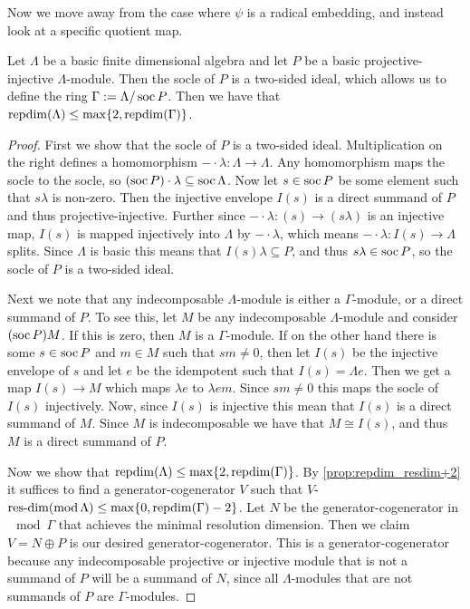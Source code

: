 Now we move away from the case where $\psi$ is a radical embedding, and instead look at a specific quotient map.

\begin{theorem}\cite[Proposition~1.2]{EHIS04}\label{thm:mod_out_socle}
	Let $\Lambda$ be a basic finite dimensional algebra and let $P$ be a basic projective-injective $\Lambda$-module. Then the socle of $P$ is a two-sided ideal, which allows us to define the ring $\Gamma := \Lambda / \operatorname{soc} P$. Then we have that $\operatorname{repdim}(\Lambda) \leq \max\{2, \operatorname{repdim}(\Gamma)\}$. 
	\begin{proof}
		First we show that the socle of $P$ is a two-sided ideal. Multiplication on the right defines a homomorphism $-\cdot \lambda\colon \Lambda \to \Lambda$. Any homomorphism maps the socle to the socle, so $(\operatorname{soc} P) \cdot \lambda \subseteq \operatorname{soc} \Lambda$. Now let $s \in \operatorname{soc} P$ be some element such that $s\lambda$ is non-zero. Then the injective envelope $I(s)$ is a direct summand of $P$ and thus projective-injective. Further since $-\cdot \lambda\colon (s) \to (s\lambda)$ is an injective map, $I(s)$ is mapped injectively into $\Lambda$ by $-\cdot \lambda$, which means $-\cdot\lambda\colon I(s) \to \Lambda$ splits. Since $\Lambda$ is basic this means that $I(s)\lambda \subseteq P$, and thus $s\lambda \in \operatorname{soc} P$, so the socle of $P$ is a two-sided ideal.
		
		Next we note that any indecomposable $\Lambda$-module is either a $\Gamma$-module, or a direct summand of $P$. To see this, let $M$ be any indecomposable $\Lambda$-module and consider $(\operatorname{soc} P)M$. If this is zero, then $M$ is a $\Gamma$-module. If on the other hand there is some $s \in \operatorname{soc} P$ and $m \in M$ such that $sm \neq 0$, then let $I(s)$ be the injective envelope of $s$ and let $e$ be the idempotent such that $I(s) = \Lambda e$. Then we get a map $I(s) \to M$ which maps $\lambda e$ to $\lambda e m$. Since $sm \neq 0$ this maps the socle of $I(s)$ injectively. Now, since $I(s)$ is injective this mean that $I(s)$ is a direct summand of $M$. Since $M$ is indecomposable we have that $M \cong I(s)$, and thus $M$ is a direct summand of $P$.
		
		Now we show that $\operatorname{repdim}(\Lambda) \leq \max\{2, \operatorname{repdim}(\Gamma)\}$. By \cref{prop:repdim_resdim+2} it suffices to find a generator-cogenerator $V$ such that $V$-$\operatorname{res-dim}(\operatorname{mod} \Lambda) \leq \max\{0, \operatorname{repdim}(\Gamma)-2\}$. Let $N$ be the generator-cogenerator in $\mod\Gamma$ that achieves the minimal resolution dimension. Then we claim $V = N \oplus P$ is our desired generator-cogenerator. This is a generator-cogenerator because any indecomposable projective or injective module that is not a summand of $P$ will be  a summand of $N$, since all $\Lambda$-modules that are not summands of $P$ are $\Gamma$-modules.
		

\end{proof}
\end{theorem}
